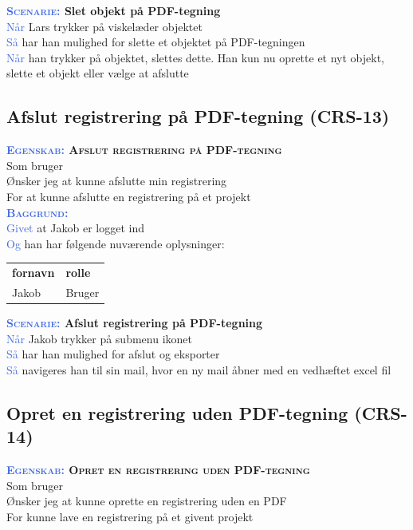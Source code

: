\textbf{\textsc{\textcolor{RoyalBlue}{Scenarie:}} Slet objekt på PDF-tegning}\\
\textcolor{RoyalBlue}{Når} Lars trykker på viskelæder objektet\\
\textcolor{RoyalBlue}{Så}  har han mulighed for slette et objektet på PDF-tegningen\\
\textcolor{RoyalBlue}{Når} han trykker på objektet, slettes dette. Han kun nu oprette et nyt objekt, slette et objekt eller vælge at afslutte \\

\clearpage

\subsection{Afslut registrering på PDF-tegning (CRS-13)} \label{sec:USAfslutRegPåPDF}
\textbf{\textsc{\textcolor{RoyalBlue}{Egenskab:} Afslut registrering på PDF-tegning}}\\
Som bruger\\
Ønsker jeg at kunne afslutte min registrering\\
For at kunne afslutte en registrering på et projekt\\

\textsc{\textcolor{RoyalBlue}{\textbf{Baggrund:}}}\\
\textcolor{RoyalBlue}{Givet} at Jakob er logget ind\\
\textcolor{RoyalBlue}{Og} han har følgende nuværende oplysninger:\\
\begin{tabular}{| l | l |}
	\textbf{fornavn} & \textbf{rolle} \\
	Jakob & Bruger\\
\end{tabular}
\newline

\textbf{\textsc{\textcolor{RoyalBlue}{Scenarie:}} Afslut registrering på PDF-tegning}\\
\textcolor{RoyalBlue}{Når} Jakob trykker på submenu ikonet\\
\textcolor{RoyalBlue}{Så}  har han mulighed for afslut og eksporter\\
\textcolor{RoyalBlue}{Så}  navigeres han til sin mail, hvor en ny mail åbner med en vedhæftet excel fil\\

\subsection{Opret en registrering uden PDF-tegning (CRS-14)} \label{sec:USOpretRegUdenPDF}
\textbf{\textsc{\textcolor{RoyalBlue}{Egenskab:} Opret en registrering uden PDF-tegning}}\\
Som bruger\\
Ønsker jeg at kunne oprette en registrering uden en PDF\\
For kunne lave en registrering på et givent projekt\\


